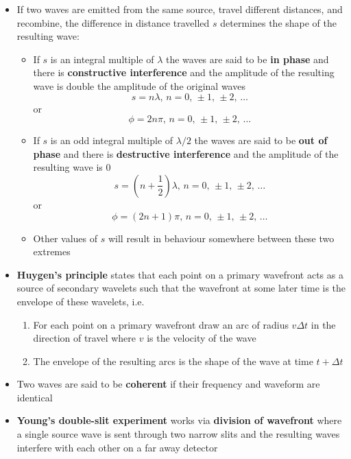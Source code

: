\documentclass{article}
\begin{document}
\begin{itemize}
  \item If two waves are emitted from the same source, travel different distances, and recombine, the difference in distance travelled $s$ determines the shape of the resulting wave:

        \begin{itemize}
          \item If $s$ is an integral multiple of $\lambda$ the waves are said to be \textbf{in phase} and there is \textbf{constructive interference} and the amplitude of the resulting wave is double the amplitude of the original waves \[s = n \lambda, \,n = 0, \,\pm 1, \,\pm 2, \,\ldots\] or \[\phi = 2 n \pi, \,n = 0, \,\pm 1, \,\pm 2, \,\ldots\]

          \item If $s$ is an odd integral multiple of $\lambda / 2$ the waves are said to be \textbf{out of phase} and there is \textbf{destructive interference} and the amplitude of the resulting wave is $0$ \[s = \left( n + \frac{1}{2} \right) \lambda, \,n = 0, \,\pm 1, \,\pm 2, \,\ldots\] or \[\phi = (2 n + 1) \pi, \,n = 0, \,\pm 1, \,\pm 2, \,\ldots\]

          \item Other values of $s$ will result in behaviour somewhere between these two extremes
        \end{itemize}

  \item \textbf{Huygen's principle} states that each point on a primary wavefront acts as a source of secondary wavelets such that the wavefront at some later time is the envelope of these wavelets, i.e.

        \begin{enumerate}
          \item For each point on a primary wavefront draw an arc of radius $v \Delta t$ in the direction of travel where $v$ is the velocity of the wave

          \item The envelope of the resulting arcs is the shape of the wave at time $t + \Delta t$
        \end{enumerate}

  \item Two waves are said to be \textbf{coherent} if their frequency and waveform are identical

  \item \textbf{Young's double-slit experiment} works via \textbf{division of wavefront} where a single source wave is sent through two narrow slits and the resulting waves interfere with each other on a far away detector


\end{itemize}
\end{document}
